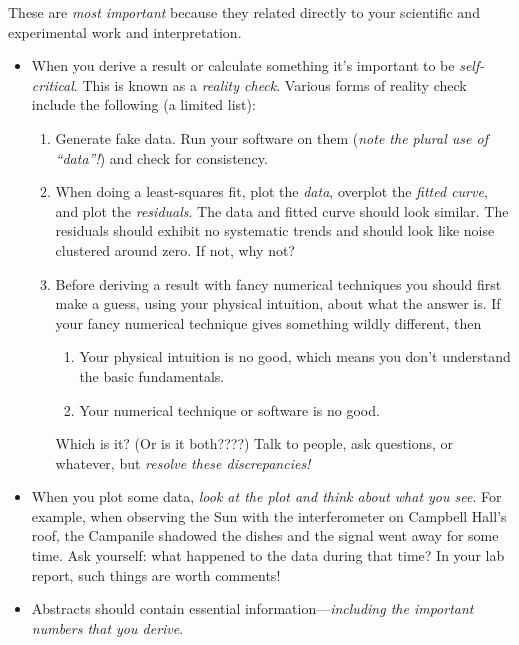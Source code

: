 \documentclass[12pt,preprint]{aastex}
\begin{document}
	These are {\it most important} because they related directly to
your scientific and experimental work and interpretation. 
\begin{itemize}

\item When you derive a result or calculate something it's important to
be {\it self-critical}. This is known as a {\it reality check}. Various forms
of reality check include the following (a limited list):
\begin{enumerate}

	\item Generate fake data. Run your software on them ({\it note
the plural use of ``data''!}) and check for consistency. 

	\item When doing a least-squares fit, plot the {\it data},
overplot the {\it fitted curve}, and plot the {\it residuals}. The data
and fitted curve should look similar. The residuals should exhibit no
systematic trends and should look like noise clustered around zero. If
not, why not?

	\item Before deriving a result with fancy numerical techniques
you should first make a guess, using your physical intuition, about what the
answer is. If your fancy numerical technique gives something wildly
different, then  \begin{enumerate}

	\item Your physical intuition is no good, which means you don't
understand the basic fundamentals. 

	\item Your numerical technique or software is no good.
\end{enumerate}

\noindent Which is it? (Or is it both????) Talk to people, ask
questions, or whatever, but {\it resolve these discrepancies!}

\end{enumerate}

	\item When you plot some data, {\it look at the plot and think
          about what you see}.  For example, when observing the Sun with
          the interferometer on Campbell Hall's roof, the Campanile
          shadowed the dishes and the signal went away for some time.
          Ask yourself: what happened to the data during that time? In
          your lab report, such things are worth comments!

\item Abstracts should contain essential information---{\it including the
important numbers that you derive}. 

\end{itemize}
\end{document}
